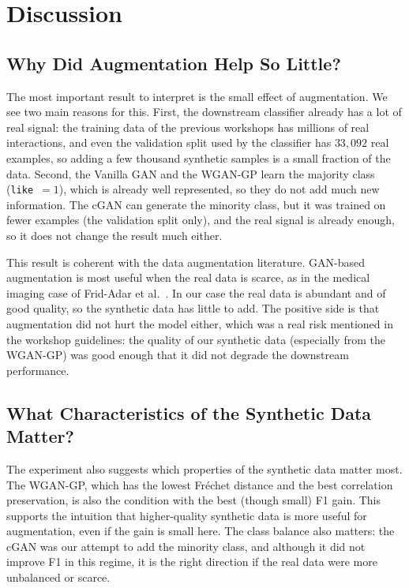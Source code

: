 \documentclass[10pt,twocolumn]{article}
\begin{document}
\section{Discussion}

\subsection{Why Did Augmentation Help So Little?}

The most important result to interpret is the small effect of augmentation. We see two main
reasons for this. First, the downstream classifier already has a lot of real signal: the
training data of the previous workshops has millions of real interactions, and even the
validation split used by the classifier has $33{,}092$ real examples, so adding a few thousand
synthetic samples is a small fraction of the data. Second, the Vanilla GAN and the WGAN-GP learn
the majority class (\texttt{like}~$=1$), which is already well represented, so they do not add
much new information. The cGAN can generate the minority class, but it was trained on fewer
examples (the validation split only), and the real signal is already enough, so it does not
change the result much either.

This result is coherent with the data augmentation literature. GAN-based augmentation is most
useful when the real data is scarce, as in the medical imaging case of
Frid-Adar et al.~\cite{fridadar2018}. In our case the real data is abundant and of good quality,
so the synthetic data has little to add. The positive side is that augmentation did not hurt the
model either, which was a real risk mentioned in the workshop guidelines: the quality of our
synthetic data (especially from the WGAN-GP) was good enough that it did not degrade the
downstream performance.

\subsection{What Characteristics of the Synthetic Data Matter?}

The experiment also suggests which properties of the synthetic data matter most. The WGAN-GP,
which has the lowest Fr\'echet distance and the best correlation preservation, is also the
condition with the best (though small) F1 gain. This supports the intuition that higher-quality
synthetic data is more useful for augmentation, even if the gain is small here. The class
balance also matters: the cGAN was our attempt to add the minority class, and although it did
not improve F1 in this regime, it is the right direction if the real data were more unbalanced
or scarce.
\end{document}
